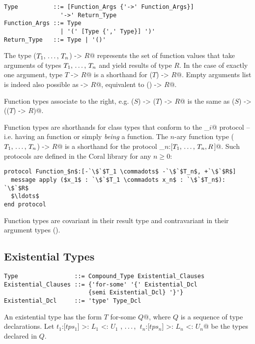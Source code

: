\syntax\begin{lstlisting}
Type          ::= [Function_Args {'->' Function_Args}] 
                '->' Return_Type
Function_Args ::= Type
                | '(' [Type {',' Type}] ')'
Return_Type   ::= Type | '()'
\end{lstlisting}

The type \lstinline@($T_1 ,\, \ldots ,\, T_n$) -> $R$@ represents the set of function values that take arguments of types $T_1 ,\, \ldots ,\, T_n$ and yield results of type $R$. In the case of exactly one argument, type \lstinline@$T$ -> $R$@ is a shorthand for \lstinline@($T$) -> $R$@. Empty arguments list is indeed also possible as \lstinline@-> $R$@, equivalent to \lstinline@() -> $R$@.

Function types associate to the right, e.g. \lstinline@($S$) -> ($T$) -> $R$@ is the same as \lstinline@($S$) -> (($T$) -> $R$)@. 

Function types are shorthands for class types that conform to the \lstinline@Function_$i$@ protocol -- i.e. having an  function or simply {\em being} a function. The $n$-ary function type \lstinline@($T_1 ,\, \ldots ,\, T_n$) -> $R$@ is a shorthand for the protocol \lstinline@Function_$n$:[$T_1 ,\, \ldots ,\, T_n,R$]@. Such protocols are defined in the Coral library for any $n \ge 0$:

\begin{lstlisting}[escapechar=`]
protocol Function_$n$:[-`\$`$T_1 \commadots$ -`\$`$T_n$, +`\$`$R$]
  message apply ($x_1$ : `\$`$T_1 \commadots x_n$ : `\$`$T_n$): `\$`$R$
  $\ldots$
end protocol
\end{lstlisting}

Function types are covariant in their result type and contravariant in their argument types ().

\subsection{Existential Types}
\label{sec:existential-types}

\syntax\begin{lstlisting}[escapechar=@]
Type                ::= Compound_Type Existential_Clauses
Existential_Clauses ::= {'for-some' '{' Existential_Dcl
                        {semi Existential_Dcl} '}'}
Existential_Dcl     ::= 'type' Type_Dcl
\end{lstlisting}

An existential type has the form \lstinline@$T$ for-some {$Q$}@, where $Q$ is a sequence of type declarations. Let \lstinline@$t_1$:[$tps_1$] >: $L_1$ <: $U_1$ $,\, \ldots ,\,$ $t_n$:[$tps_n$] >: $L_n$ <: $U_n$@ be the types declared in $Q$. 

